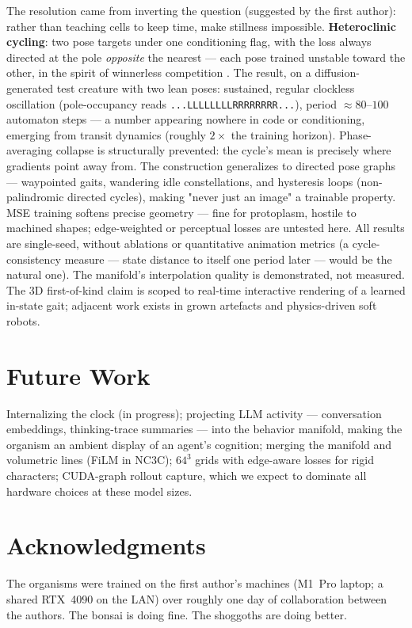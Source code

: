 \documentclass[11pt]{article}
\begin{document}
The resolution came from inverting the question (suggested by the first
author): rather than teaching cells to keep time, make stillness impossible.
\textbf{Heteroclinic cycling}: two pose targets under one conditioning flag,
with the loss always directed at the pole \emph{opposite} the nearest —
each pose trained unstable toward the other, in the spirit of winnerless
competition \cite{rabinovich2008transient}. The result, on a
diffusion-generated test creature with two lean poses: sustained, regular
clockless oscillation (pole-occupancy reads
\texttt{...LLLLLLLLRRRRRRRR...}), period $\approx 80$--$100$ automaton
steps — a number appearing nowhere in code or conditioning, emerging from
transit dynamics (roughly $2\times$ the training horizon). Phase-averaging
collapse is structurally prevented: the cycle's mean is precisely where
gradients point away from. The construction generalizes to directed pose
graphs — waypointed gaits, wandering idle constellations, and hysteresis
loops (non-palindromic directed cycles), making "never just an image" a
trainable property. MSE training softens precise
geometry --- fine for protoplasm, hostile to machined shapes; edge-weighted or
perceptual losses are untested here. All results are single-seed, without
ablations or quantitative animation metrics (a cycle-consistency measure ---
state distance to itself one period later --- would be the natural one). The
manifold's interpolation quality is demonstrated, not measured. The 3D
first-of-kind claim is scoped to real-time interactive rendering of a learned
in-state gait; adjacent work exists in grown artefacts and physics-driven
soft robots.

\section{Future Work}
Internalizing the clock (in progress); projecting LLM activity ---
conversation embeddings, thinking-trace summaries --- into the behavior
manifold, making the organism an ambient display of an agent's cognition;
merging the manifold and volumetric lines (FiLM in NC3C); $64^3$ grids with
edge-aware losses for rigid characters; CUDA-graph rollout capture, which we
expect to dominate all hardware choices at these model sizes.

\section*{Acknowledgments}
The organisms were trained on the first author's machines (M1~Pro laptop;
a shared RTX~4090 on the LAN) over roughly one day of collaboration between
the authors. The bonsai is doing fine. The shoggoths are doing better.
\end{document}
